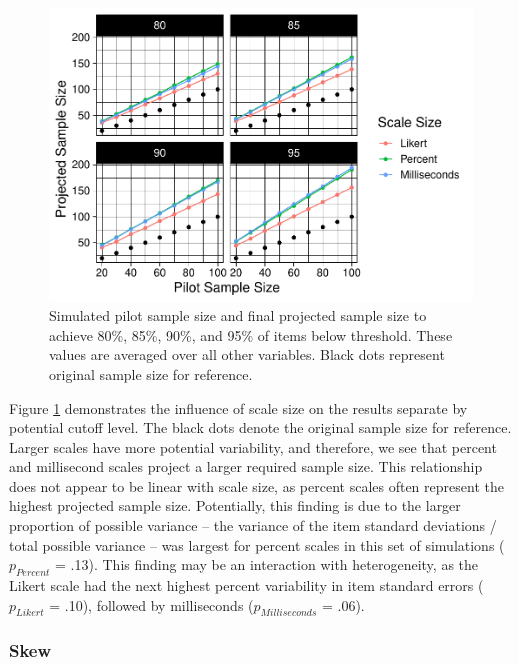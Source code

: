 \documentclass[
  man]{apa7}
\begin{document}
\begin{figure}
\centering
\includegraphics{manuscript_draft_files/figure-latex/scale-size-figure-1.pdf}
\caption{\label{fig:scale-size-figure}Simulated pilot sample size and final projected sample size to achieve 80\%, 85\%, 90\%, and 95\% of items below threshold. These values are averaged over all other variables. Black dots represent original sample size for reference.}
\end{figure}

Figure \ref{fig:scale-size-figure} demonstrates the influence of scale size on the results separate by potential cutoff level. The black dots denote the original sample size for reference. Larger scales have more potential variability, and therefore, we see that percent and millisecond scales project a larger required sample size. This relationship does not appear to be linear with scale size, as percent scales often represent the highest projected sample size. Potentially, this finding is due to the larger proportion of possible variance -- the variance of the item standard deviations / total possible variance -- was largest for percent scales in this set of simulations (\(p_{Percent}\) = .13). This finding may be an interaction with heterogeneity, as the Likert scale had the next highest percent variability in item standard errors (\(p_{Likert}\) = .10), followed by milliseconds (\(p_{Milliseconds}\) = .06).

\hypertarget{skew}{%
\subsubsection{Skew}\label{skew}}
\end{document}
